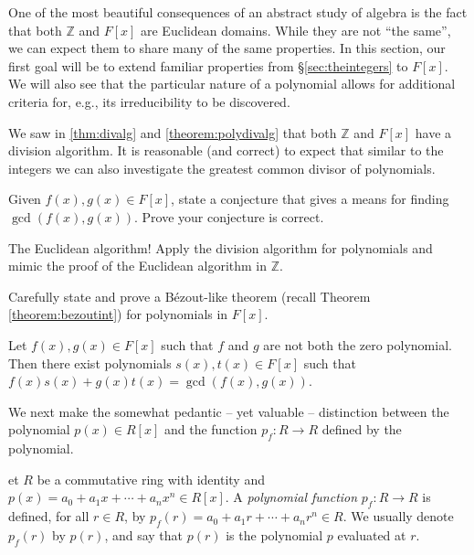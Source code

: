 \documentclass[english,course]{lecture}
\newenvironment{solution}[1][Solution]{\begin{trivlist}\pushQED{\qed}\item[\hskip \labelsep  \bfseries #1{}.\hspace{10pt}]}{\popQED\end{trivlist}}\renewcommand{\qedsymbol}{$\checkmark$}{\newenvironment{answer}{\renewcommand\qedsymbol{$\blacklozenge$}\begin{proof}[Answer]}{\end{proof}}}\newenvironment{answer}[1][Answer]{\begin{trivlist}\pushQED{\qed}\item[\hskip \labelsep  \bfseries #1{}.\hspace{10pt}]}{\popQED\end{trivlist}}\renewcommand{\qedsymbol}{$\lozenge$}
\theoremstyle{plain}
\newenvironment{definition}[1]
  {\renewcommand\theinnerdefinition{#1}\innerdefinition}
  {\endinnerdefinition}
\def\Z{{\mathbb Z}}
\def\Q{{\mathbb Q}}
\def\presnotes{}
\begin{document}



One of the most beautiful consequences of an abstract study of algebra is the fact that both $\Z$ and $F[x]$ are Euclidean domains.
While they are not ``the same'', we can expect them to share many of the same properties.
In this section, our first goal will be to extend familiar properties from \S \ref{sec:theintegers} to $F[x]$. 
We will also see that the particular nature of a polynomial allows for additional criteria for, e.g., its irreducibility to be discovered.


We saw in \ref{thm:divalg} and \ref{theorem:polydivalg} that both $\Z$ and $F[x]$ have a division algorithm. It is reasonable (and correct) to expect that similar to the integers we can also investigate the greatest common divisor of polynomials.


\begin{exer}
	Given $f(x),g(x)\in F[x]$, state a conjecture that gives a means for finding $\gcd(f(x),g(x))$.
	Prove your conjecture is correct.
\end{exer}

\begin{solution}
	The Euclidean algorithm! Apply the division algorithm for polynomials and mimic the proof of the Euclidean algorithm in $\Z$.
\end{solution}

\presnotes

\begin{exer}
	Carefully state and prove a B\'{e}zout-like theorem (recall Theorem \ref{theorem:bezoutint}) for polynomials in $F[x]$.
\end{exer}

\begin{solution}
	Let $f(x), g(x)\in F[x]$ such that $f$ and $g$ are not both the zero polynomial.
	Then there exist polynomials $s(x), t(x)\in F[x]$ such that $f(x) s(x) + g(x) t(x) = \gcd(f(x),g(x))$.
\end{solution}

\presnotes



We next make the somewhat pedantic -- yet valuable -- distinction between the polynomial $p(x)\in R[x]$ and the function $p_f : R\to R$ defined by the polynomial.



\begin{definition}
	Let $R$ be a commutative ring with identity and $p(x) = a_0 + a_1 x + \cdots + a_n x^n \in R[x]$.
	A \emph{polynomial function} $p_f : R \to R$ is defined, for all $r\in R$, by $p_f(r) = a_0 + a_1 r + \cdots + a_n r^n \in R$.
	We usually denote $p_f(r)$ by $p(r)$, and say that $p(r)$ is the polynomial $p$ evaluated at $r$.
\end{definition}
\end{document}
